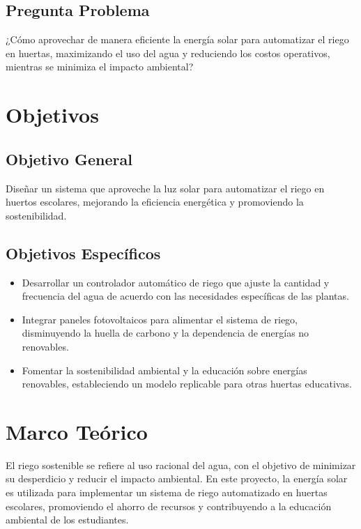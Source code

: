 \documentclass[12pt]{article}
\begin{document}
\subsection{Pregunta Problema}
¿Cómo aprovechar de manera eficiente la energía solar para automatizar el riego en huertas, maximizando el uso del agua y reduciendo los costos operativos, mientras se minimiza el impacto ambiental?
\newpage
\section{Objetivos}
\subsection{Objetivo General}
Diseñar un sistema que aproveche la luz solar para automatizar el riego en huertos escolares, mejorando la eficiencia energética y promoviendo la sostenibilidad.


\subsection{Objetivos Específicos}
\begin{itemize}
      \item Desarrollar un controlador automático de riego que ajuste la cantidad y frecuencia del agua de acuerdo con las necesidades específicas de las plantas.
      \item Integrar paneles fotovoltaicos para alimentar el sistema de riego, disminuyendo la huella de carbono y la dependencia de energías no renovables.
      \item Fomentar la sostenibilidad ambiental y la educación sobre energías renovables, estableciendo un modelo replicable para otras huertas educativas.
\end{itemize}
\newpage
\section{Marco Teórico}
El riego sostenible se refiere al uso racional del agua, con el objetivo de minimizar su desperdicio y reducir el impacto ambiental. En este proyecto, la energía solar es utilizada para implementar un sistema de riego automatizado en huertas escolares, promoviendo el ahorro de recursos y contribuyendo a la educación ambiental de los estudiantes.
\end{document}
